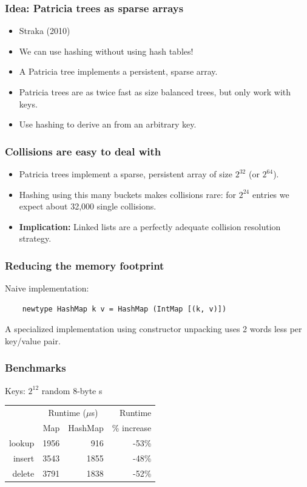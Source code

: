 \documentclass[xetex,mathserif,serif]{beamer}
\newcommand{\code}[1]{\mbox{\texttt{\small{\color{CodeColor}{#1}}}}}
\begin{document}
\begin{frame}
  \frametitle{Idea: Patricia trees as sparse arrays}
  \begin{itemize}
  \item Straka (2010)
  \item We can use hashing without using hash tables!
  \item A Patricia tree implements a persistent, sparse array.
  \item Patricia trees are as twice fast as size balanced trees, but
    only work with \code{Int} keys.
  \item Use hashing to derive an \code{Int} from an arbitrary
    key.
  \end{itemize}
\end{frame}

\begin{frame}
  \frametitle{Collisions are easy to deal with}
  \begin{itemize}
  \item Patricia trees implement a sparse, persistent array of size
    $2^{32}$ (or $2^{64}$).
  \item Hashing using this many buckets makes collisions rare: for
    $2^{24}$ entries we expect about 32,000 single collisions.
  \item \textbf{Implication:} Linked lists are a perfectly adequate
    collision resolution strategy.
  \end{itemize}
\end{frame}

\begin{frame}[fragile]
  \frametitle{Reducing the memory footprint}

  Naive implementation:
  \begin{lstlisting}
    newtype HashMap k v = HashMap (IntMap [(k, v)])
  \end{lstlisting}

  A specialized implementation using constructor unpacking uses 2
  words less per key/value pair.
\end{frame}

\begin{frame}
  \frametitle{Benchmarks}

  Keys: $2^{12}$ random 8-byte \code{ByteString}s

  \bigskip
  \begin{center}
  \begin{tabular}{r|rrr}
                  & \multicolumn{2}{c}{Runtime ($\mu$s)} & Runtime \\
                  & Map & HashMap & \% increase \\
    \hline lookup & 1956 &  916 & -53\% \\
           insert & 3543 & 1855 & -48\% \\
           delete & 3791 & 1838 & -52\% \\
  \end{tabular}
  \end{center}
\end{frame}
\end{document}

